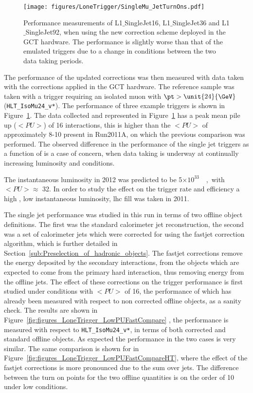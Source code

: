 \begin{figure}[htbp]
  \centering
    \texttt{[image: figures/LoneTrigger/SingleMu\_JetTurnOns.pdf]}
  \caption{Performance measurements of L1$\_$SingleJet16, L1$\_$SingleJet36 and L1$\_$SingleJet92, when using the new correction scheme deployed in the GCT hardware. The performance is slightly worse than that of the emulated triggers due to a change in \pu conditions between the two data taking periods.}
  \label{fig:figures_LoneTrigger_SingleMu_JetTurnOns}
\end{figure}

The performance of the updated corrections was then measured with data taken 
with the corrections applied in the GCT hardware. The reference sample was 
taken with a trigger requiring an isolated muon with $\pt > \unit{24}{\GeV}$  (\verb|HLT_IsoMu24_v*|).
The performance of three example triggers is shown in 
Figure~\ref{fig:figures_LoneTrigger_SingleMu_JetTurnOns}.
The data collected and represented in 
Figure~\ref{fig:figures_LoneTrigger_SingleMu_JetTurnOns} has a peak mean pile 
up ($<PU>$) of 16 interactions, this is higher than the $<PU>$ of approximately 
8-10 present in Run2011A, on which the previous comparison was performed.
The observed difference in the performance of the \Lone single jet triggers as 
a function of \pu is a case of concern, when data taking is underway at 
continually increasing luminosity and \pu conditions.

The instantaneous luminosity in 2012 was predicted to be \unit{5$\times 10 ^{33}$}{\lumiunits}, with $<PU> \approx$ 32. In order to study the effect on the trigger rate and efficiency a high \pu, low instantaneous luminosity, \ac{lhc} fill was taken in 2011.

The \Lone single jet performance was studied in this run in terms of two 
offline object definitions. The first was the standard \AK calorimeter jet 
reconstruction, the second was a set of \AK calorimeter jets which were 
corrected for \pu using the fastjet correction algorithm, which is further 
detailed in Section~\ref{sub:Preselection_of_hadronic_objects}.
The fastjet corrections remove the energy deposited by the secondary 
interactions, from the objects which are expected to come from the primary hard 
interaction, thus removing energy from the offline jets.
The effect of these \pu corrections on the \Lone trigger performance is 
first studied under conditions with $<PU>$ of 16, the performance of which has 
already been measured with respect to non \pu corrected offline objects, as 
a sanity check. The results are shown in 
Figure~\ref{fig:figures_LoneTrigger_LowPUFastCompare} , the performance is 
measured with respect to \verb|HLT_IsoMu24_v*|, in terms of both \pu 
corrected and standard offline objects. As expected the performance in the two 
cases is very similar. The same comparison is shown for \HT in 
Figure~\ref{fig:figures_LoneTrigger_LowPUFastCompareHT}, where the effect of 
the fastjet\cite{Cacciari:2011ma} corrections is more pronounced due to the 
sum over jets. The difference between the turn on points for the two offline 
quantities is on the order of \unit{10}{\GeV} under low \pu conditions.

